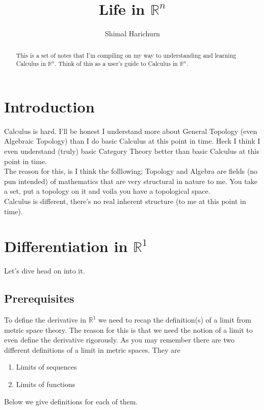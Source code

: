 \documentclass[12pt]{article}
\title{Life in $\mathbb{R}^n$}
\author{Shimal Harichurn}
\theoremstyle{definition}
\theoremstyle{remark}
\begin{document}
	\maketitle
	\begin{abstract}
		\begin{center}
			This is a set of notes that I'm compiling on my way to understanding and learning Calculus in $\mathbb{R}^n$. Think of this as a user's guide to Calculus in $\mathbb{R}^n$.
		\end{center}
	\end{abstract}
	
	\section{Introduction}
		
	Calculus is hard. I'll be honest I understand more about General Topology (even Algebraic Topology) than I do basic Calculus at this point in time. Heck I think I even understand (truly) basic Category Theory better than basic Calculus at this point in time. \\
		
	The reason for this, is I think the folllowing; Topology and Algebra are fields (no pun intended) of mathematics that are very structural in nature to me. You take a set, put a topology on it and voila you have a topological space. \\
			
	Calculus is different, there's no real inherent structure (to me at this point in time).
	\newpage
	\section{Differentiation in $\mathbb{R}^1$}
	Let's dive head on into it.
	\subsection{Prerequisites}
	To define the derivative in $\mathbb{R}^1$ we need to recap the definition(s) of a limit from metric space theory. The reason for this is that we need the notion of a limit to even define the derivative rigorously. As you may remember there are two different definitions of a limit in metric spaces. They are 
	\begin{enumerate}
		\item Limits of sequences
		\item Limits of functions
	\end{enumerate}
	Below we give definitions for each of them. 
	
\end{document}
